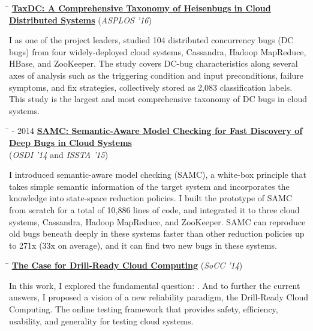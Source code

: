 \documentclass[10pt]{article} %
\begin{document}
\begin{tabbing}
\hspace{2.5cm} \=  \>\+ \href{http://ucare.cs.uchicago.edu/pdf/asplos16-TaxDC.pdf}{\textbf{TaxDC: A Comprehensive Taxonomy of Heisenbugs in Cloud Distributed Systems}} (\textit{ASPLOS '16}) \\
\begin{minipage}{\smallertextwidth}
I as one of the project leaders, studied 104 distributed concurrency bugs (DC
bugs) from four widely-deployed cloud systems, Cassandra, Hadoop MapReduce,
HBase, and ZooKeeper. The study covers DC-bug characteristics along several axes
of analysis such as the triggering condition and input preconditions, failure
symptoms, and fix strategies, collectively stored as 2,083 classification labels.
This study is the largest and most comprehensive taxonomy of DC bugs in cloud
systems.
\end{minipage}
\end{tabbing}

\begin{tabbing}
\hspace{2.5cm} \=  - 2014 \> \href{http://ucare.cs.uchicago.edu/pdf/osdi14-samc.pdf}{\textbf{SAMC: Semantic-Aware Model Checking for Fast Discovery of Deep Bugs in Cloud Systems}} \\
\>\+ (\textit{OSDI '14} and \textit{ISSTA '15}) \\
\begin{minipage}{\smallertextwidth}
I introduced semantic-aware model checking (SAMC), a white-box principle that
takes simple semantic information of the target system and incorporates the
knowledge into state-space reduction policies. I built the prototype of SAMC
from scratch for a total of 10,886 lines of code, and integrated it to three
cloud systems, Cassandra, Hadoop MapReduce, and ZooKeeper. SAMC can reproduce
old bugs beneath deeply in these systems faster than other reduction policies up
to 271x (33x on average), and it can find two new bugs in these systems.
\end{minipage}
\end{tabbing}

\begin{tabbing}
\hspace{2.5cm} \=  \>\+ \href{http://ucare.cs.uchicago.edu/pdf/socc14-drill.pdf}{\textbf{The Case for Drill-Ready Cloud Computing}} (\textit{SoCC '14}) \\
\begin{minipage}{\smallertextwidth}
In this work, I explored the fundamental question: . And to further the current answers, I proposed a vision of a new
reliability paradigm, the Drill-Ready Cloud Computing. The online testing
framework that provides safety, efficiency, usability, and generality for
testing cloud systems.
\end{minipage}
\end{tabbing}
\end{document}
